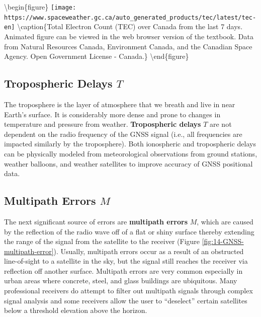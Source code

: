 \documentclass[
]{book}
\begin{document}
\textbackslash begin\{figure\}
\texttt{[image: https://www.spaceweather.gc.ca/auto\_generated\_products/tec/latest/tec-en]} \textbackslash caption\{Total Electron Count (TEC) over Canada from the last 7 days. Animated figure can be viewed in the web browser version of the textbook. Data from Natural Resources Canada, Environment Canada, and the Canadian Space Agency. Open Government License - Canada.\}\label{fig:14-total-electron-count-canada}
\textbackslash end\{figure\}

\hypertarget{tropospheric-delays-t}{%
\subsection{\texorpdfstring{Tropospheric Delays \(T\)}{Tropospheric Delays T}}\label{tropospheric-delays-t}}

The troposphere is the layer of atmosphere that we breath and live in near Earth's surface. It is considerably more dense and prone to changes in temperature and pressure from weather. \textbf{Tropospheric delays} \(T\) are not dependent on the radio frequency of the GNSS signal (i.e., all frequencies are impacted similarly by the troposphere). Both ionospheric and tropospheric delays can be physically modeled from meteorological observations from ground stations, weather balloons, and weather satellites to improve accuracy of GNSS positional data.

\hypertarget{multipath-errors-m}{%
\subsection{\texorpdfstring{Multipath Errors \(M\)}{Multipath Errors M}}\label{multipath-errors-m}}

The next significant source of errors are \textbf{multipath errors} \(M\), which are caused by the reflection of the radio wave off of a flat or shiny surface thereby extending the range of the signal from the satellite to the receiver (Figure \ref{fig:14-GNSS-multipath-error}). Usually, multipath errors occur as a result of an obstructed line-of-sight to a satellite in the sky, but the signal still reaches the receiver via reflection off another surface. Multipath errors are very common especially in urban areas where concrete, steel, and glass buildings are ubiquitous. Many professional receivers do attempt to filter out multipath signals through complex signal analysis and some receivers allow the user to ``deselect'' certain satellites below a threshold elevation above the horizon.
\end{document}
